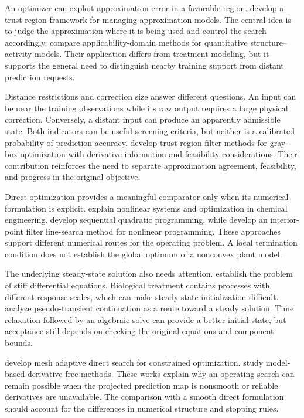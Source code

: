 An optimizer can exploit approximation error in a favorable region. \citet{Alexandrov1998} develop a trust-region framework for managing approximation models. The central idea is to judge the approximation where it is being used and control the search accordingly. \citet{Sahigara2012} compare applicability-domain methods for quantitative structure--activity models. Their application differs from treatment modeling, but it supports the general need to distinguish nearby training support from distant prediction requests.

Distance restrictions and correction size answer different questions. An input can be near the training observations while its raw output requires a large physical correction. Conversely, a distant input can produce an apparently admissible state. Both indicators can be useful screening criteria, but neither is a calibrated probability of prediction accuracy. \citet{Hameed2026} develop trust-region filter methods for gray-box optimization with derivative information and feasibility considerations. Their contribution reinforces the need to separate approximation agreement, feasibility, and progress in the original objective.

Direct optimization provides a meaningful comparator only when its numerical formulation is explicit. \citet{BuzziFerraris2013} explain nonlinear systems and optimization in chemical engineering. \citet{Kraft1988} develop sequential quadratic programming, while \citet{WachterBiegler2006} develop an interior-point filter line-search method for nonlinear programming. These approaches support different numerical routes for the operating problem. A local termination condition does not establish the global optimum of a nonconvex plant model.

The underlying steady-state solution also needs attention. \citet{CurtissHirschfelder1952} establish the problem of stiff differential equations. Biological treatment contains processes with different response scales, which can make steady-state initialization difficult. \citet{KelleyKeyes1998} analyze pseudo-transient continuation as a route toward a steady solution. Time relaxation followed by an algebraic solve can provide a better initial state, but acceptance still depends on checking the original equations and component bounds.

\citet{AudetDennis2006} develop mesh adaptive direct search for constrained optimization. \citet{Ragonneau2022} study model-based derivative-free methods. These works explain why an operating search can remain possible when the projected prediction map is nonsmooth or reliable derivatives are unavailable. The comparison with a smooth direct formulation should account for the differences in numerical structure and stopping rules.

